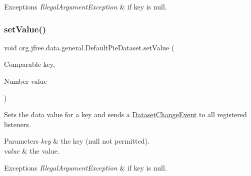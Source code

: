 \begin{DoxyExceptions}{Exceptions}
{\em Illegal\+Argument\+Exception} & if {\ttfamily key} is {\ttfamily null}. \\
\hline
\end{DoxyExceptions}
\mbox{\label{classorg_1_1jfree_1_1data_1_1general_1_1_default_pie_dataset_a9b76e9970b368488fc229c3ca034447f}} 
\subsubsection{\texorpdfstring{set\+Value()}{setValue()}\hspace{0.1cm}{\footnotesize\ttfamily [1/2]}}
{\footnotesize\ttfamily void org.\+jfree.\+data.\+general.\+Default\+Pie\+Dataset.\+set\+Value (\begin{DoxyParamCaption}\item[{Comparable}]{key,  }\item[{Number}]{value }\end{DoxyParamCaption})}

Sets the data value for a key and sends a \mbox{\hyperlink{classorg_1_1jfree_1_1data_1_1general_1_1_dataset_change_event}{Dataset\+Change\+Event}} to all registered listeners.


\begin{DoxyParams}{Parameters}
{\em key} & the key ({\ttfamily null} not permitted). \\
\hline
{\em value} & the value.\\
\hline
\end{DoxyParams}

\begin{DoxyExceptions}{Exceptions}
{\em Illegal\+Argument\+Exception} & if {\ttfamily key} is {\ttfamily null}. \\
\hline
\end{DoxyExceptions}
\mbox{\label{classorg_1_1jfree_1_1data_1_1general_1_1_default_pie_dataset_a5d0c9ef0aae8f601d3d46c969c6cdbb2}} 
